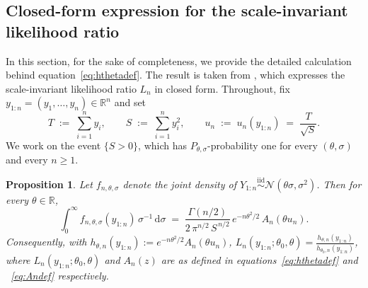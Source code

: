 \documentclass[numsec,webpdf,modern,medium,namedate]{oup-authoring-template}
\theoremstyle{thmstyleone}%
\newtheorem{proposition}[theorem]{Proposition}%
\theoremstyle{thmstyletwo}%
\theoremstyle{thmstylethree}%
\newcommand{\diff}{\mathrm{d}}
\newcommand{\1}{\mathbf{1}}
\begin{document}
\begin{appendices}

\section{Closed-form expression for the scale-invariant likelihood ratio}\label{app:a}

In this section, for the sake of completeness, we provide the detailed calculation behind equation~\eqref{eq:hthetadef}. The result is taken from \cite{Wang2025}, which expresses the scale-invariant likelihood ratio $L_n$ in closed form. Throughout, fix $y_{1:n}=(y_1,\dots,y_n)\in\mathbb{R}^n$ and set
\[
  T \;:=\; \sum_{i=1}^{n}y_i,
  \qquad
  S \;:=\; \sum_{i=1}^{n}y_i^{2},
  \qquad
  u_n \;:=\; u_n(y_{1:n}) \;=\; \frac{T}{\sqrt{S}}.
\]
We work on the event $\{S>0\}$, which has $P_{\theta,\sigma}$-probability
one for every $(\theta,\sigma)$ and every $n\geq 1$.



\begin{proposition}
\label{prop:scale-invariant}
Let $f_{n,\theta,\sigma}$ denote the joint density of
$Y_{1:n}\stackrel{\mathrm{iid}}{\sim}\mathcal{N}(\theta\sigma,\sigma^{2})$.
Then for every $\theta\in\mathbb{R}$,
\begin{equation}
\label{eq:integratedlik}
\int_{0}^{\infty} f_{n,\theta,\sigma}(y_{1:n})\,\sigma^{-1}\,\diff\sigma
\;=\;
\frac{\Gamma(n/2)}{2\,\pi^{n/2}\,S^{\,n/2}}\,
e^{-n\theta^{2}/2}\, A_n(\theta u_n).
\end{equation}
Consequently, with $h_{\theta,n}(y_{1:n}):=e^{-n\theta^{2}/2}A_n(\theta u_n)$, $L_n(y_{1:n};\theta_0,\theta) = \frac{h_{\theta,n}(y_{1:n})}{h_{\theta_0,n}(y_{1:n})}$, 
where $L_n(y_{1:n};\theta_0,\theta)$ and $A_n(z)$ are as defined in equations~\eqref{eq:hthetadef} and ~\eqref{eq:Andef} respectively.

\end{proposition}


\end{appendices}
\end{document}
